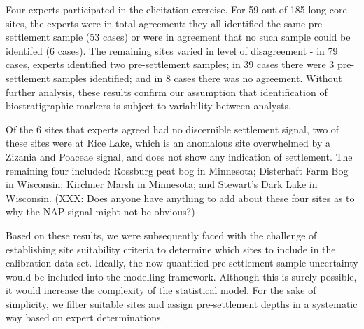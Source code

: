 \documentclass[12pt]{article}
\begin{document}
Four experts participated in the elicitation exercise. For 59 out of
185 long core sites, the experts were in total agreement: they all
identified the same pre-settlement sample (53 cases) or were in
agreement that no such sample could be identifed (6 cases). The
remaining sites varied in level of disagreement - in 79 cases, experts
identified two pre-settlement samples; in 39 cases there were 3
pre-settlement samples identified; and in 8 cases there was no
agreement. Without further analysis, these results confirm our
assumption that identification of biostratigraphic markers is subject
to variability between analysts.

Of the 6 sites that experts agreed had no discernible settlement
signal, two of these sites were at Rice Lake, which is an anomalous
site overwhelmed by a Zizania and Poaceae signal, and does not show
any indication of settlement. The remaining four included: Rossburg
peat bog in Minnesota; Disterhaft Farm Bog in Wisconsin; Kirchner
Marsh in Minnesota; and Stewart's Dark Lake in Wisconsin. (XXX: Does
anyone have anything to add about these four sites as to why the NAP
signal might not be obvious?)

Based on these results, we were subsequently faced with the challenge
of establishing site suitability criteria to determine which sites to
include in the calibration data set. Ideally, the now quantified
pre-settlement sample uncertainty would be included into the modelling
framework. Although this is surely possible, it would increase the
complexity of the statistical model. For the sake of simplicity, we
filter suitable sites and assign pre-settlement depths in a systematic
way based on expert determinations.

\end{document}
